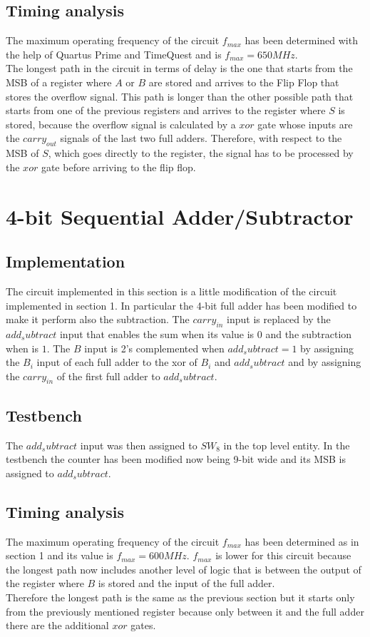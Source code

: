 \documentclass[12pt]{article}
\begin{document}
\subsection{Timing analysis}
The maximum operating frequency of the circuit $f_{max}$ has been determined with the help of Quartus Prime and TimeQuest and is $f_{max}=650MHz$.\\
The longest path in the circuit in terms of delay is the one that starts from the MSB of a register where $A$ or $B$ are stored and arrives to the Flip Flop that stores the overflow signal. This path is longer than the other possible path that starts from one of the previous registers and arrives to the register where $S$ is stored, because the overflow signal is calculated by a $xor$ gate whose inputs are the $carry_{out}$ signals of the last two full adders. Therefore, with respect to the MSB of $S$, which goes directly to the register, the signal has to be processed by the $xor$ gate before arriving to the flip flop.


\section{4-bit Sequential Adder/Subtractor}
\subsection{Implementation}
The circuit implemented in this section is a little modification of the circuit implemented in section 1. In particular the  4-bit full adder has been modified to make it perform also the subtraction. The $carry_{in}$ input is replaced by the $add_subtract$ input  that enables the sum when its value is $0$ and the subtraction when is $1$. The $B$ input is 2's complemented when $add_subtract=1$ by assigning the $B_i$ input of each full adder to the xor of $B_i$ and $add_subtract$ and by assigning the $carry_{in}$ of the first full adder to $add_subtract$.\\ 
\subsection{Testbench}
The $add_subtract$ input was then assigned to $SW_8$ in the top level entity. In the testbench the counter has been modified now being 9-bit wide and its MSB is assigned to $add_subtract$.\\ 
\subsection{Timing analysis}
The maximum operating frequency of the circuit $f_{max}$ has been determined  as in section 1 and its value is $f_{max}=600MHz$. $f_{max}$ is lower for this circuit because the longest path now includes another level of logic that  is between the output of the register where $B$ is stored and the input of the full adder. \\
Therefore the longest path is the same as the previous section but it starts only from the previously mentioned register because only between  it and the full adder there are the additional $xor$ gates.\\
\end{document}
